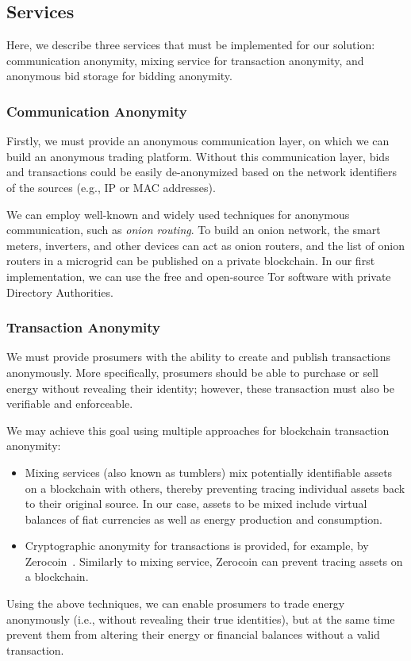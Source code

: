 \subsection{Services}

Here, we describe three services that must be implemented for our solution: communication anonymity, mixing service for transaction anonymity, and anonymous bid storage for bidding anonymity.

\subsubsection{Communication Anonymity}
Firstly, we must provide an anonymous communication layer, on which we can build an anonymous trading platform.
Without this communication layer, bids and transactions could be easily de-anonymized based on the network identifiers of the sources (e.g., IP or MAC addresses).

We can employ well-known and widely used techniques for anonymous communication, such as \emph{onion routing}.
To build an onion network, the smart meters, inverters, and other devices can act as onion routers, and the list of onion routers in a microgrid can be published on a private blockchain.
In our first implementation, we can use the free and open-source Tor software with private Directory Authorities.

\subsubsection{Transaction Anonymity}
We must provide prosumers with the ability to create and publish transactions anonymously.
More specifically, prosumers should be able to purchase or sell energy without revealing their identity; however, these transaction must also be verifiable and enforceable.

We may achieve this goal using multiple approaches for blockchain transaction anonymity:
\begin{itemize}
\item Mixing services (also known as tumblers) mix potentially identifiable assets on a blockchain with others, thereby preventing tracing individual assets back to their original source. 
In our case, assets to be mixed include virtual balances of fiat currencies as well as energy production and consumption.
\item Cryptographic anonymity for transactions is provided, for example, by Zerocoin~\cite{miers2013zerocoin}. Similarly to mixing service, Zerocoin can prevent tracing assets on a blockchain.
\end{itemize}
Using the above techniques, we can enable prosumers to trade energy anonymously (i.e., without revealing their true identities), but at the same time prevent them from altering their energy or financial balances without a valid transaction.

